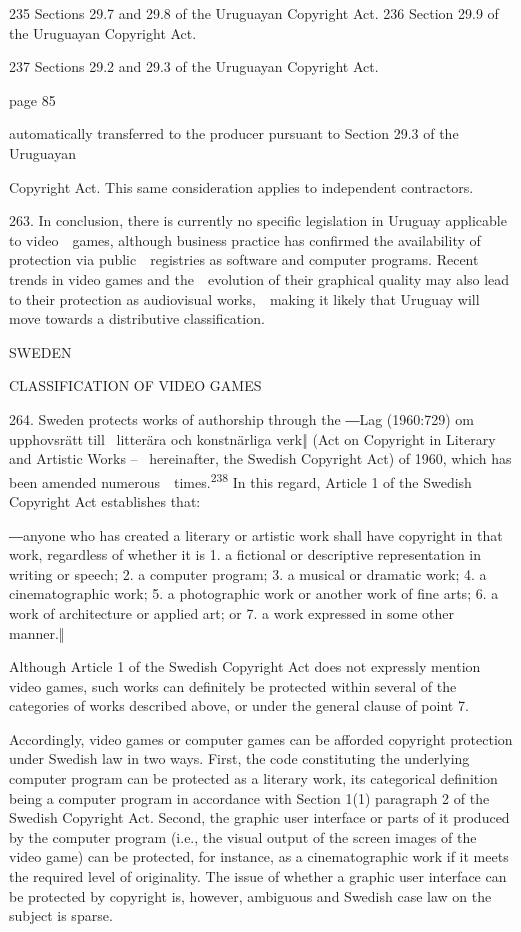 \documentclass[
]{article}
\begin{document}
{235 }{Sections 29.7 and 29.8 of the Uruguayan }{Copyright Act}{. }{236
}{Section 29.9 of the Uruguayan }{Copyright Act}{.}

{237 }{Sections 29.2 and 29.3 of the Uruguayan }{Copyright Act}{.}

{page 85}

{automatically transferred to the producer pursuant to Section 29.3 of
the Uruguayan}

{Copyright Act}{. This same consideration applies to independent
contractors.}

{263. }{In conclusion, there is currently no specific legislation in
Uruguay applicable to video~~games, although business practice has
confirmed the availability of protection via public~~registries as
software and computer programs. Recent trends in video games and
the~~evolution of their graphical quality may also lead to their
protection as audiovisual works,~~making it likely that Uruguay will
move towards a distributive classification.}

{SWEDEN}

{CLASSIFICATION OF VIDEO GAMES}

{264. }{Sweden protects works of authorship through the ―}{Lag
(1960:729) om upphovsrätt till }{~litterära och konstnärliga verk‖
}{(}{Act on Copyright in Literary and Artistic Works }{--
}{~hereinafter, the Swedish }{Copyright Act}{) of 1960, which has been
amended numerous~~times.}\textsuperscript{{238 }}{In this regard,
Article 1 of the Swedish }{Copyright Act }{establishes that:}

{―}{anyone who has created a literary or artistic work shall have
copyright in that work, regardless of whether it is 1. a fictional or
descriptive representation in writing or speech; 2. a computer program;
3. a musical or dramatic work; 4. a cinematographic work; 5. a
photographic work or another work of fine arts; 6. a work of
architecture or applied art; or 7. a work expressed in some other
manner}{.‖}

{Although Article 1 of the Swedish }{Copyright Act }{does not expressly
mention video games, such works can definitely be protected within
several of the categories of works described above, or under the general
clause of point 7.}

{Accordingly, video games or computer games can be afforded copyright
protection under Swedish law in two ways. First, the code constituting
the underlying computer program can be protected as a literary work, its
categorical definition being a computer program in accordance with
Section 1(1) paragraph 2 of the Swedish }{Copyright Act}{. Second, the
graphic user interface or parts of it produced by the computer program
(i.e., the visual output of the screen images of the video game) can be
protected, for instance, as a cinematographic work if it meets the
required level of originality. The issue of whether a graphic user
interface can be protected by copyright is, however, ambiguous and
Swedish case law on the subject is sparse.}
\end{document}
